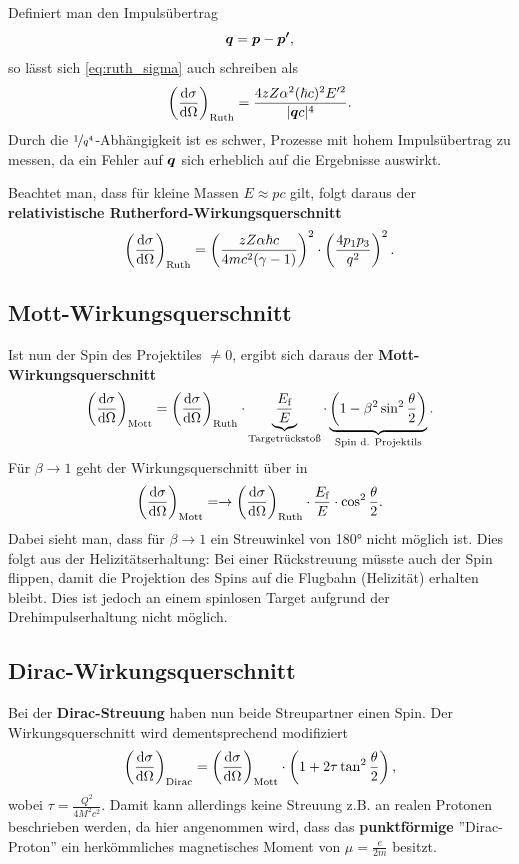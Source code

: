 Definiert man den Impulsübertrag
\begin{equation*}
	\mvec{q} = \mvec{p}-\mvec{p'},
\end{equation*}
so lässt sich \autoref{eq:ruth_sigma} auch schreiben als
\begin{equation*}
	\left(\diff[\sigma]{\Omega}\right)_\text{Ruth} = \frac{4zZ\alpha^2(\hbar c)^2 E'^2}{|\mvec{q}c|^4}.
\end{equation*}
Durch die $\nicefrac{1}{q^4}$-Abhängigkeit ist es schwer, Prozesse mit hohem Impulsübertrag zu messen, da ein Fehler auf $\mvec{q}$ sich erheblich auf die Ergebnisse auswirkt.

Beachtet man, dass für kleine Massen $E\approx pc$ gilt, folgt daraus der \textbf{relativistische Rutherford-Wirkungsquerschnitt}
\begin{equation*}
	\left(\diff[\sigma]{\Omega}\right)_\text{Ruth} = \left(\frac{zZ\alpha\hbar c}{4mc^2(\gamma-1)}\right)^2\cdot\left(\frac{4p_1p_3}{q^2}\right)^2.
\end{equation*}

\subsection{Mott-Wirkungsquerschnitt}
Ist nun der Spin des Projektiles $\neq 0$, ergibt sich daraus der \textbf{Mott-Wirkungsquerschnitt}
\begin{equation*}
	\left(\diff[\sigma]{\Omega}\right)_\text{Mott} = \left(\diff[\sigma]{\Omega}\right)_\text{Ruth}\cdot\underbrace{\frac{E_\text{f}}{E}}_\text{Targetrückstoß}\cdot\underbrace{\left(1-\beta^2\sin^2\frac{\theta}{2}\right)}_\text{Spin d. Projektils}.
\end{equation*}
Für $\beta\rightarrow 1$ geht der Wirkungsquerschnitt über in
\begin{equation*}
	\left(\diff[\sigma]{\Omega}\right)_\text{Mott}= \rightarrow\left(\diff[\sigma]{\Omega}\right)_\text{Ruth}\cdot\frac{E_\text{f}}{E}\cdot\cos^2\frac{\theta}{2}.
\end{equation*}
Dabei sieht man, dass für $\beta\rightarrow 1$ ein Streuwinkel von 180° nicht möglich ist.
Dies folgt aus der Helizitätserhaltung: Bei einer Rückstreuung müsste auch der Spin flippen, damit die Projektion des Spins auf die Flugbahn (Helizität) erhalten bleibt. Dies ist jedoch an einem spinlosen Target aufgrund der Drehimpulserhaltung nicht möglich.

\subsection{Dirac-Wirkungsquerschnitt}
Bei der \textbf{Dirac-Streuung} haben nun beide Streupartner einen Spin.
Der Wirkungsquerschnitt wird dementsprechend modifiziert
\begin{equation*}
	\left(\diff[\sigma]{\Omega}\right)_\text{Dirac} = \left(\diff[\sigma]{\Omega}\right)_\text{Mott}\cdot\left(1+2\tau\tan^2\frac{\theta}{2}\right),
\end{equation*}
wobei $\tau = \frac{Q^2}{4M^2c^2}$.
Damit kann allerdings keine Streuung z.B. an realen Protonen beschrieben werden, da hier angenommen wird, dass das \textbf{punktförmige} ''Dirac-Proton'' ein herkömmliches magnetisches Moment von $\mu=\frac{e}{2m}$ besitzt.

